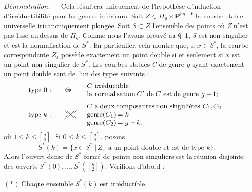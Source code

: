 \documentclass[10pt]{article}
\newcommand{\PP}{\mathbf P}
\begin{document}
\noindent\emph{Démonstration.} --- Cela résultera uniquement de l'hypothèse d'induction d'irréductibilité pour les genres inférieurs. Soit $Z\subset H_g\times\PP^{5g-6}$ la courbe stable universelle tricanoniquement plongée. Soit $S\subset Z$ l'ensemble des points où $Z$ n'est pas lisse au-dessus de $H_g$. Comme nous l'avons prouvé au \S~1, $S$ est non singulier et est la normalisation de $S^*$. En particulier, cela montre que, si $x\in S^*$, la courbe correspondante $Z_x$ possède exactement un point double si et seulement si $x$ est un point non singulier de $S^*$. Les courbes stables $C$ de genre $g$ ayant exactement un point double sont de l'un des types suivants :
\[
\begin{array}{rcll}
\text{type }0:&&
\begin{tikzpicture}[scale=.32,baseline=-.7ex,line width=.45pt]
\draw (0,0).. controls (.45,.55) and (1.0,.35)..(.95,-.15);
\draw (0,0).. controls (.45,-.55) and (1.0,-.35)..(.95,.15);
\draw (.05,.05)--(.9,-.12);
\draw (.05,-.05)--(.9,.12);
\end{tikzpicture}
& \begin{array}{l}C\text{ irréductible}\\
\text{la normalisation }C'\text{ de }C\text{ est de genre }g-1 ;
\end{array}\\[1.2em]
\text{type }k:&&
\begin{tikzpicture}[scale=.32,baseline=-.7ex,line width=.45pt]
\draw (-.15,-.55)--(.9,.55);
\draw (-.15,.55)--(.9,-.55);
\draw (-.55,.75)--(-.15,.15);
\draw (-.55,-.75)--(-.15,-.15);
\draw (.9,.15)--(1.35,.75);
\draw (.9,-.15)--(1.35,-.75);
\end{tikzpicture}
& \begin{array}{l}C\text{ a deux composantes non singulières }C_1,C_2\\
\operatorname{genre}(C_1)=k\\
\operatorname{genre}(C_2)=g-k .
\end{array}
\end{array}
\]
où $1\leq k\leq\left[\frac g2\right]$. Si $0\leq k\leq\left[\frac g2\right]$, posons
\[
S^*(k)=\{x\in S^*\mid Z_x\text{ a un point double et est de type }k\}.
\]
Alors l'ouvert dense de $S^*$ formé de points non singuliers est la réunion disjointe des ouverts $S^*(0),\ldots,S^*(\left[\frac g2\right])$. Vérifions d'abord :

\medskip
\noindent$(*)$ Chaque ensemble $S^*(k)$ est irréductible.
\end{document}
